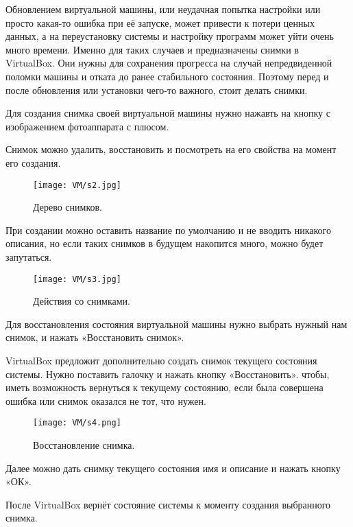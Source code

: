 Обновлением виртуальной машины, или неудачная попытка настройки или просто какая-то ошибка при её запуске, может привести к потери ценных данных, а на переустановку системы и настройку программ может уйти очень много времени. Именно для таких случаев и предназначены снимки в VirtualBox. Они нужны для сохранения прогресса на случай непредвиденной поломки машины и отката до ранее стабильного состояния. Поэтому перед и после обновления или установки чего-то важного, стоит делать снимки.

Для создания снимка своей виртуальной машины нужно нажавть на кнопку с изображением фотоаппарата с плюсом.

Снимок можно удалить, восстановить и посмотреть на его свойства на момент его создания.

\begin{figure}[h]
		\centering
		\texttt{[image: VM/s2.jpg]}
\caption{Дерево снимков.}
\label{ris:image}
\end{figure}

При создании можно оставить название по умолчанию и не вводить никакого описания, но если таких снимков в будущем накопится много, можно будет запутаться. 

\begin{figure}[h]
		\centering
		\texttt{[image: VM/s3.jpg]}
\caption{Действия со снимками.}
\label{ris:image}
\end{figure}

Для восстановления состояния виртуальной машины нужно выбрать нужный нам снимок, и нажать «Восстановить снимок».
 
VirtualBox предложит дополнительно создать снимок текущего состояния системы. Нужно поставить галочку и нажать кнопку «Восстановить». чтобы, иметь возможность вернуться к  текущему состоянию, если была совершена ошибка или снимок оказался не тот, что нужен.
 
\begin{figure}[h]
		\centering
		\texttt{[image: VM/s4.png]}
\caption{Восстановление снимка.}
\label{ris:image}
\end{figure}

Далее можно дать снимку текущего состояния имя и описание и нажать кнопку «ОК».

После VirtualBox вернёт состояние системы к моменту создания выбранного снимка.

